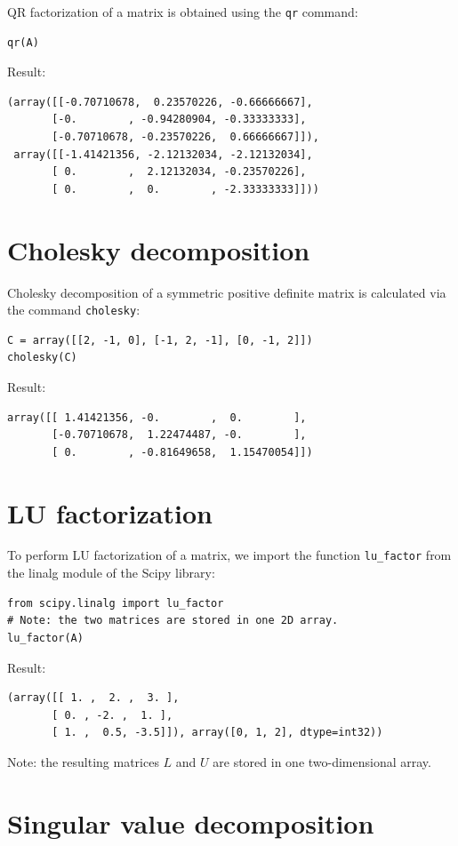 \documentclass[article,A4,12pt]{llncs}
\begin{document}
QR factorization of a matrix is obtained using the {\tt qr} command:
\begin{verbatim}
qr(A)
\end{verbatim}
Result:
\begin{verbatim}
(array([[-0.70710678,  0.23570226, -0.66666667],
       [-0.        , -0.94280904, -0.33333333],
       [-0.70710678, -0.23570226,  0.66666667]]), 
 array([[-1.41421356, -2.12132034, -2.12132034],
       [ 0.        ,  2.12132034, -0.23570226],
       [ 0.        ,  0.        , -2.33333333]]))
\end{verbatim}

\section{Cholesky decomposition}

Cholesky decomposition of a symmetric positive definite matrix is 
calculated via the command {\tt cholesky}:
\begin{verbatim}
C = array([[2, -1, 0], [-1, 2, -1], [0, -1, 2]])
cholesky(C)
\end{verbatim}
Result:
\begin{verbatim}
array([[ 1.41421356, -0.        ,  0.        ],
       [-0.70710678,  1.22474487, -0.        ],
       [ 0.        , -0.81649658,  1.15470054]])
\end{verbatim}

\section{LU factorization}

To perform LU factorization of a matrix, we import the function {\tt lu\_factor}
from the linalg module of the Scipy library:
\begin{verbatim}
from scipy.linalg import lu_factor
# Note: the two matrices are stored in one 2D array.
lu_factor(A)
\end{verbatim}
Result:
\begin{verbatim}
(array([[ 1. ,  2. ,  3. ],
       [ 0. , -2. ,  1. ],
       [ 1. ,  0.5, -3.5]]), array([0, 1, 2], dtype=int32))
\end{verbatim}
Note: the resulting matrices $L$ and $U$ are stored in one two-dimensional array.

\section{Singular value decomposition}
\end{document}

